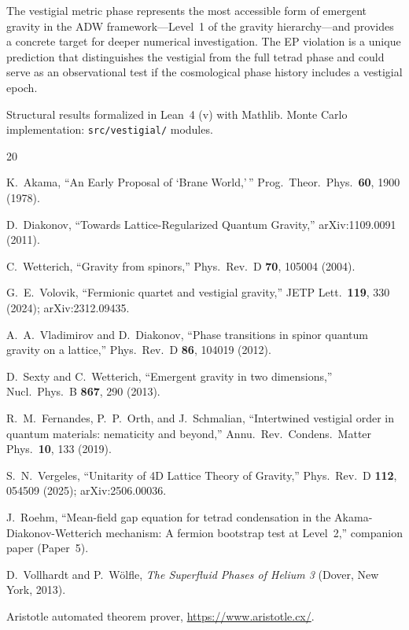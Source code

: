 \documentclass[aps,prd,twocolumn,superscriptaddress,nofootinbib]{revtex4-2}
\begin{document}
The vestigial metric phase represents the most accessible form of
emergent gravity in the ADW framework---Level~1 of the gravity
hierarchy---and provides a concrete target for deeper numerical
investigation. The EP violation is a unique prediction that
distinguishes the vestigial from the full tetrad phase and could serve
as an observational test if the cosmological phase history includes a
vestigial epoch.

\begin{acknowledgments}
Structural results formalized in Lean~4 (v\leantoolchain) with Mathlib.
Monte Carlo implementation: \texttt{src/vestigial/} modules.
\end{acknowledgments}

\begin{thebibliography}{20}

 K.~Akama,
  ``An Early Proposal of `Brane World,'\,''
  Prog.\ Theor.\ Phys.\ \textbf{60}, 1900 (1978).

 D.~Diakonov,
  ``Towards Lattice-Regularized Quantum Gravity,''
  arXiv:1109.0091 (2011).

 C.~Wetterich,
  ``Gravity from spinors,''
  Phys.\ Rev.\ D \textbf{70}, 105004 (2004).

 G.~E.~Volovik,
  ``Fermionic quartet and vestigial gravity,''
  JETP Lett.\ \textbf{119}, 330 (2024);
  arXiv:2312.09435.

 A.~A.~Vladimirov and D.~Diakonov,
  ``Phase transitions in spinor quantum gravity on a lattice,''
  Phys.\ Rev.\ D \textbf{86}, 104019 (2012).

 D.~Sexty and C.~Wetterich,
  ``Emergent gravity in two dimensions,''
  Nucl.\ Phys.\ B \textbf{867}, 290 (2013).

 R.~M.~Fernandes, P.~P.~Orth, and J.~Schmalian,
  ``Intertwined vestigial order in quantum materials:
    nematicity and beyond,''
  Annu.\ Rev.\ Condens.\ Matter Phys.\ \textbf{10}, 133 (2019).

 S.~N.~Vergeles,
  ``Unitarity of 4D Lattice Theory of Gravity,''
  Phys.\ Rev.\ D \textbf{112}, 054509 (2025); arXiv:2506.00036.

 J.~Roehm,
  ``Mean-field gap equation for tetrad condensation in the
  Akama-Diakonov-Wetterich mechanism: A fermion bootstrap test
  at Level~2,''
  companion paper (Paper~5).

 D.~Vollhardt and P.~W\"olfle,
  \emph{The Superfluid Phases of Helium 3}
  (Dover, New York, 2013).

 Aristotle automated theorem prover,
  \url{https://www.aristotle.cx/}.

\end{thebibliography}
\end{document}
